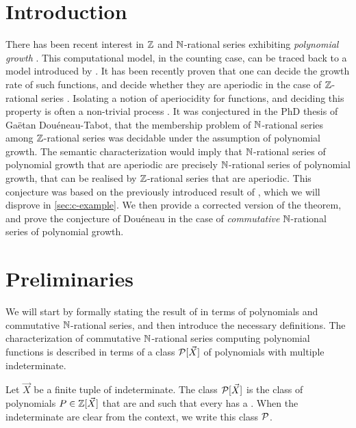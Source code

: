 \documentclass[a4paper,11pt]{article}
\begin{document}
\maketitle
\makeabstract
\acknowledge


\section{Introduction}


There has been recent interest in $\mathbb{Z}$ and $\mathbb{N}$-rational series exhibiting
\emph{polynomial growth} \cite{doueneau2021pebble,bojanczyk2022transducers}.
This computational model, in the counting case, can be traced back to a model
introduced by \textcite{schutzenberger1965finite}. It has been recently proven
that one can decide the growth rate of such functions, and decide whether they
are aperiodic in the case of $\mathbb{Z}$-rational series \cite{LOPEZ23b}. Isolating
a notion of aperiocidity for functions, and deciding this property is often a
non-trivial process \cite{droste2019aperiodic}. It was conjectured in the PhD
thesis of Gaëtan Douéneau-Tabot, that the membership problem of $\mathbb{N}$-rational
series among $\mathbb{Z}$-rational series was decidable under the assumption of
polynomial growth. The semantic characterization would imply that
$\mathbb{N}$-rational series of polynomial growth that are aperiodic are precisely
$\mathbb{N}$-rational series of polynomial growth, that can be realised by
$\mathbb{Z}$-rational series that are aperiodic. This conjecture was based on the
previously introduced result of \textcite[Theorem 3.3]{KARH77}, which we will
disprove in \cref{sec:c-example}. 
We then provide a corrected version of the theorem, and prove the conjecture
of Douéneau in the case of \emph{commutative} $\mathbb{N}$-rational series of
polynomial growth.

\section{Preliminaries}

We will start by formally stating the result of \citeauthor{KARH77}
in terms of polynomials and commutative $\mathbb{N}$-rational series, and
then introduce the necessary definitions. The characterization of
commutative $\mathbb{N}$-rational series computing polynomial functions
is described in terms of a class $\mathcal{P}[\vec{X}]$ of
polynomials with multiple indeterminate.

\begin{definition}
    Let $\vec{X}$ be a finite tuple of indeterminate.
    The class $\mathcal{P}[\vec{X}]$
    is the class of polynomials $P \in \mathbb{Z}[\vec{X}]$
    that are 
    and such that every  has a .
    When the indeterminate are clear from the context, we write
    this class $\mathcal{P}$.
\end{definition}
\end{document}

